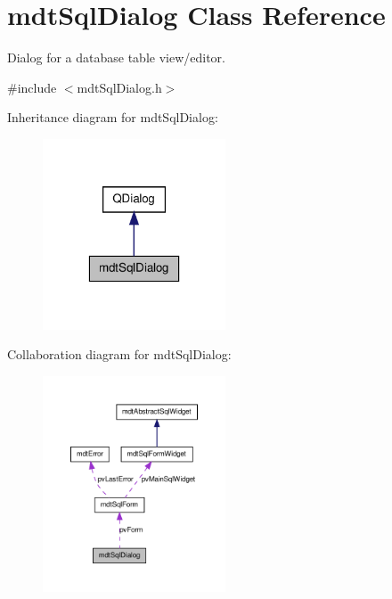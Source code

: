 \hypertarget{classmdt_sql_dialog}{\section{mdt\-Sql\-Dialog Class Reference}
\label{classmdt_sql_dialog}
}


Dialog for a database table view/editor.  




{\ttfamily \#include $<$mdt\-Sql\-Dialog.\-h$>$}



Inheritance diagram for mdt\-Sql\-Dialog\-:\nopagebreak
\begin{figure}[H]
\begin{center}
\leavevmode
\includegraphics[width=154pt]{classmdt_sql_dialog__inherit__graph}
\end{center}
\end{figure}


Collaboration diagram for mdt\-Sql\-Dialog\-:\nopagebreak
\begin{figure}[H]
\begin{center}
\leavevmode
\includegraphics[width=154pt]{classmdt_sql_dialog__coll__graph}
\end{center}
\end{figure}
